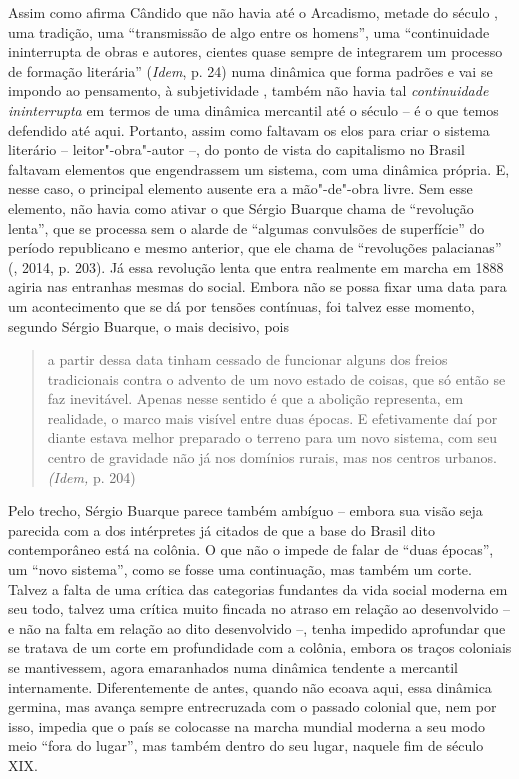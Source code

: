 {Assim como afirma Cândido que não havia até o Arcadismo, metade do
século , uma tradição, uma ``transmissão de algo entre os homens'',
uma ``continuidade ininterrupta de obras e autores, cientes quase sempre
de integrarem um processo de formação literária'' (\emph{Idem}, p. 24)
numa dinâmica que forma padrões e vai se impondo ao pensamento, à
subjetividade , também não havia tal \emph{continuidade ininterrupta} em
termos de uma dinâmica mercantil até o século  -- é o que temos
defendido até aqui. Portanto, assim como faltavam os elos para criar o
sistema literário -- leitor"-obra"-autor --, do ponto de vista do
capitalismo no Brasil faltavam elementos que engendrassem um sistema,
com uma dinâmica própria. E, nesse caso, o principal elemento ausente
era a mão"-de"-obra livre. Sem esse elemento, não havia como ativar o que
Sérgio Buarque chama de ``revolução lenta'', que se processa sem o
alarde de ``algumas convulsões de superfície'' do período republicano e
mesmo anterior, que ele chama de ``revoluções palacianas'' (,
2014, p. 203). Já essa revolução lenta que entra realmente em marcha em
1888 agiria nas entranhas mesmas do social. Embora não se possa fixar
uma data para um acontecimento que se dá por tensões contínuas, foi
talvez esse momento, segundo Sérgio Buarque, o mais decisivo, pois

\begin{quote}
a partir dessa data tinham cessado de funcionar alguns dos freios
tradicionais contra o advento de um novo estado de coisas, que só então
se faz inevitável. Apenas nesse sentido é que a abolição representa, em
realidade, o marco mais visível entre duas épocas. E efetivamente daí
por diante estava melhor preparado o terreno para um novo sistema, com
seu centro de gravidade não já nos domínios rurais, mas nos centros
urbanos. \emph{(Idem,} p. 204)
\end{quote}

Pelo trecho, Sérgio Buarque parece também ambíguo -- embora sua visão
seja parecida com a dos intérpretes já citados de que a base do Brasil
dito contemporâneo está na colônia. O que não o impede de falar de
``duas épocas'', um ``novo sistema'', como se fosse uma continuação, mas
também um corte. Talvez a falta de uma crítica das categorias fundantes
da vida social moderna em seu todo, talvez uma crítica muito fincada no
atraso em relação ao desenvolvido -- e não na falta em relação ao dito
desenvolvido --, tenha impedido aprofundar que se tratava de um corte em
profundidade com a colônia, embora os traços coloniais se mantivessem,
agora emaranhados numa dinâmica tendente a mercantil internamente.
Diferentemente de antes, quando não ecoava aqui, essa dinâmica germina,
mas avança sempre entrecruzada com o passado colonial que, nem por isso,
impedia que o país se colocasse na marcha mundial moderna a seu modo
meio ``fora do lugar'', mas também dentro do seu lugar, naquele fim de
século XIX.

}
